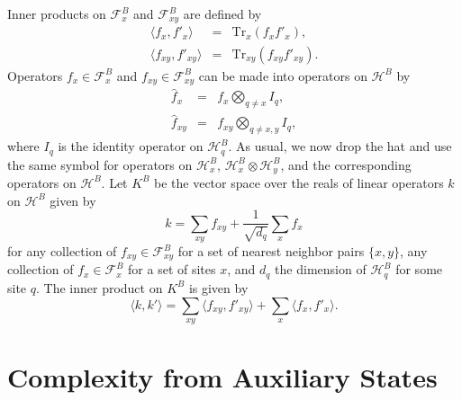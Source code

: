 \documentclass[twocolumn,amsmath,amssymb]{revtex4-1}
\begin{document}
Inner products on $\mathcal{F}^B_x$ and $\mathcal{F}^B_{xy}$ are defined by
\begin{subequations}
\begin{eqnarray}
  \label{ffprime1x}
   \langle  f_x, f'_x \rangle  &=& \mathrm{Tr}_x( f_x f'_x), \\
  \label{ffprime2x}
   \langle  f_{xy}, f'_{xy} \rangle  &=& \mathrm{Tr}_{xy}( f_{xy} f'_{xy}).
\end{eqnarray}
\end{subequations}
Operators
$f_x \in \mathcal{F}^B_x$ and $f_{xy} \in \mathcal{F}^B_{xy}$ can be made into
operators on $\mathcal{H}^B$ by 
\begin{subequations}
\begin{eqnarray}
\label{defhf1x}
\hat{ f}_x &=&  f_x \bigotimes_{q \ne x} I_q, \\
\label{defhf2x}
\hat{ f}_{xy} &=&  f_{xy} \bigotimes_{q \ne x,y} I_q, 
\end{eqnarray}
\end{subequations}
where $I_q$ is the identity operator on $\mathcal{H}^B_q$.
As usual, we now drop the hat and use the same symbol for operators  
on $\mathcal{H}^B_x$,
$\mathcal{H}^B_x \otimes \mathcal{H}^B_y$,
and the corresponding operators on $\mathcal{H}^B$.
Let $K^B$ be the vector space over the
reals of linear operators $k$ on $\mathcal{H}^B$ given by 
\begin{equation}
\label{defk1x}
k = \sum_{x y} f_{x y} + \frac{1}{\sqrt{d_q}} \sum_x f_x
\end{equation}
for any collection of 
$f_{x y} \in \mathcal{F}^B_{x y}$ for a set of nearest neighbor pairs $\{x, y\}$,
any collection of $f_x \in \mathcal{F}^B_x$ for a set of sites $x$, and $d_q$ the dimension
of $\mathcal{H}^B_q$ for some site $q$.
The inner product on $K^B$ is given by 
\begin{equation}
\label{defkkprime1x}
 \langle  k, k' \rangle   =  \sum_{xy}  \langle  f_{xy}, f'_{xy} \rangle  + \sum_x  \langle  f_x, f'_x \rangle .
\end{equation}

\section{\label{subsec:auxiliarycomplexity} Complexity from Auxiliary States}
\end{document}
